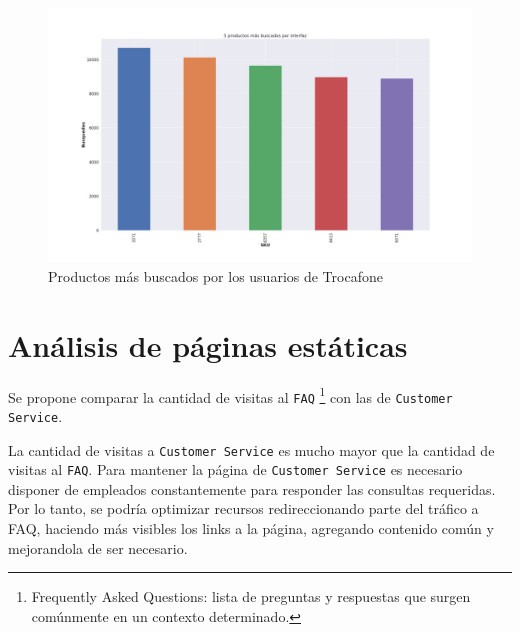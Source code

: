 \documentclass[a4paper]{article}
\begin{document}
\begin{figure}[h!]
	\includegraphics[width=\linewidth]{figures/08-skus_buscados-barplot.png}
	\caption{Productos más buscados por los usuarios de Trocafone}
	\label{searchedproduct}
\end{figure}

\section{Análisis de páginas estáticas}

Se propone comparar la cantidad de visitas al \texttt{FAQ} \footnote{Frequently Asked Questions: lista de preguntas y respuestas que surgen comúnmente en un contexto determinado.} con las de \texttt{Customer Service}.

La cantidad de visitas a \texttt{Customer Service} es mucho mayor que la cantidad de visitas al \texttt{FAQ}. Para mantener la página de \texttt{Customer Service} es necesario disponer de empleados constantemente para responder las consultas requeridas. Por lo tanto, se podría optimizar recursos redireccionando parte del tráfico a FAQ, haciendo más visibles los links a la página, agregando contenido común y mejorandola de ser necesario.
\end{document}
